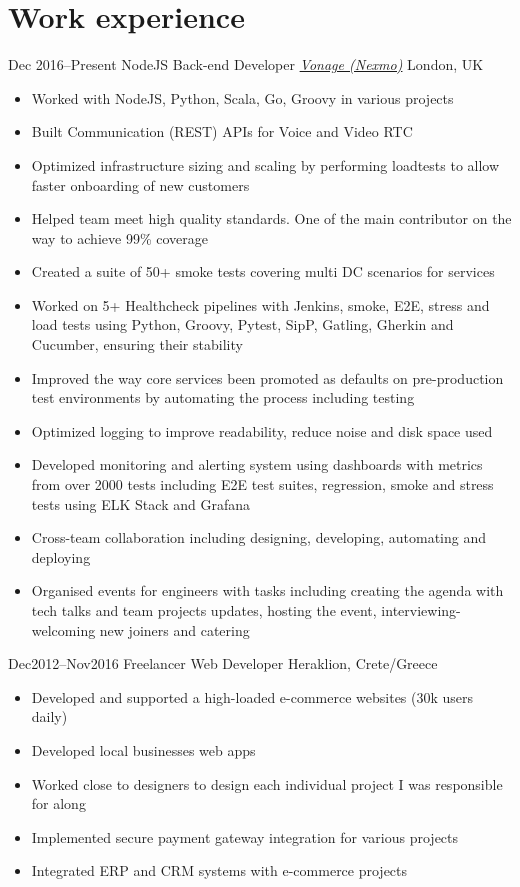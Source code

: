 \section{\normalfont Work experience}
\vspace{-.1cm}
\begin{entrylist}
\entry
{Dec 2016--Present}
{NodeJS Back-end Developer {\normalfont \emph{\href{https://www.vonage.co.uk/}{Vonage (Nexmo)}}}}
{London, UK}
\vspace{-0.6cm}
\begin{itemize}[leftmargin=.6cm]
	\item Worked with NodeJS, Python, Scala, Go, Groovy in various projects
	\item Built Communication (REST) APIs for Voice and Video RTC
	\item Optimized infrastructure sizing and scaling by performing loadtests to allow faster onboarding of new customers
	\item Helped team meet high quality standards. One of the main contributor on the way to achieve 99\% coverage
	\item Created a suite of 50+ smoke tests covering multi DC scenarios for services
	\item Worked on 5+ Healthcheck pipelines with Jenkins, smoke, E2E, stress and load tests using Python, Groovy, Pytest, SipP, Gatling, Gherkin and Cucumber, ensuring their stability
	\item Improved the way core services been promoted as defaults on pre-production test environments by automating the process including testing
	\item Optimized logging to improve readability, reduce noise and disk space used
	\item Developed monitoring and alerting system using dashboards with metrics from over 2000 tests including E2E test suites, regression, smoke and stress tests using ELK Stack and Grafana
	\item Cross-team collaboration including designing, developing, automating and deploying
	\item Organised events for engineers with tasks including creating the agenda with tech talks and team projects updates, hosting the event, interviewing-welcoming new joiners and catering
\end{itemize}

\entry
{Dec2012–Nov2016}
{Freelancer Web Developer}
{Heraklion, Crete/Greece}
\vspace{-0.6cm}
\begin{itemize}[leftmargin=.6cm]
	\item Developed and supported a high-loaded e-commerce websites (30k users daily)
	\item Developed local businesses web apps 
	\item Worked close to designers to design each individual project I was responsible for along
	\item Implemented secure payment gateway integration for various projects
	\item Integrated ERP and CRM systems with e-commerce projects 
\end{itemize}


\end{entrylist}
